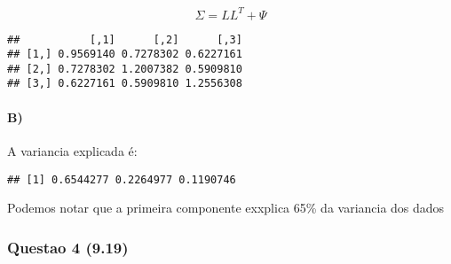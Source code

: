 \documentclass[
]{article}
\begin{document}
\[
\Sigma = LL^T + \Psi
\]

\begin{verbatim}
##           [,1]      [,2]      [,3]
## [1,] 0.9569140 0.7278302 0.6227161
## [2,] 0.7278302 1.2007382 0.5909810
## [3,] 0.6227161 0.5909810 1.2556308
\end{verbatim}

\hypertarget{b-1}{%
\paragraph{B)}\label{b-1}}

A variancia explicada é:

\begin{verbatim}
## [1] 0.6544277 0.2264977 0.1190746
\end{verbatim}

Podemos notar que a primeira componente exxplica 65\% da variancia dos
dados

\newpage

\hypertarget{questao-4-9.19}{%
\subsubsection{Questao 4 (9.19)}\label{questao-4-9.19}}
\end{document}
